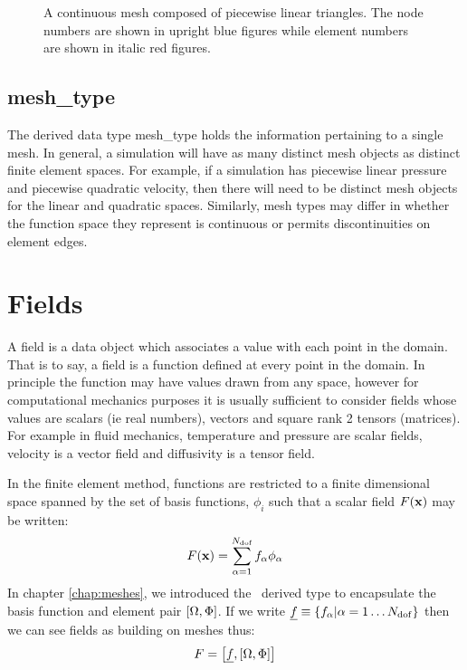 \documentclass[a4paper, 11pt]{book}
\newcommand{\ifhtlatex}[2]{\ifthenelse{\boolean{HTLatex}}{#1}{#2}}
\newcommand{\targetlabel}[1]{\hypertarget{#1}{}\label{#1}}
\newcommand{\xfig}[1]{
  \ifhtlatex{
    \texttt{[image: \#1.png]}
  }{
    
  }
}
\begin{document}
\begin{figure}[t]
  \centering
  \xfig{mesh}
  \caption{A continuous mesh composed of piecewise linear triangles. The
    node numbers are shown in upright blue figures while element numbers are
  shown in italic red figures.}
  \label{fig:meshnumbering}
\end{figure}



\section{mesh\_type}\targetlabel{type:mesh}

The derived data type mesh\_type holds the information pertaining to a
single mesh. In general, a simulation will have as many distinct mesh
objects as distinct finite element spaces. For example, if a simulation has
piecewise linear pressure and piecewise quadratic velocity, then there will
need to be distinct mesh objects for the linear and quadratic
spaces. Similarly, mesh types may differ in whether the function space they
represent is continuous or permits discontinuities on element edges.


\chapter{Fields}

A field is a data object which associates a value with each point in the
domain. That is to say, a field is a function defined at every point in the
domain. In principle the function may have values drawn from any space,
however for computational mechanics purposes it is usually sufficient to
consider fields whose values are scalars (ie real numbers), vectors and
square rank 2 tensors (matrices). For example in fluid mechanics,
temperature and pressure are scalar fields, velocity is a vector field and
diffusivity is a tensor field.

In the finite element method, functions are restricted to a
finite dimensional space spanned by the set of basis functions, $\phi_i$
such that a scalar field $F(\mathbf{x})$ may be written:
\begin{equation}
  F(\mathbf{x})=\sum_{\alpha=1}^{N_\mathrm{dof}} f_\alpha\phi_\alpha
\end{equation}
In chapter \ref{chap:meshes}, we introduced the \meshtype\ derived type to
encapsulate the basis function and element pair $[\Omega,\Phi]$. If we write
$\underline{f}\equiv \{f_\alpha|\alpha=1\ldots N_\mathrm{dof}\}$ then we can see fields as building on
meshes thus:
\begin{equation}\label{eq:scalarfield}
  F=\left[\underline{f},[\Omega,\Phi]\right]
\end{equation}
\end{document}
